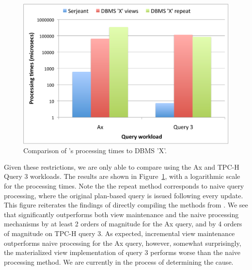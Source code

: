 \begin{figure}[htbp]
\includegraphics[scale=0.35]{figures/dbcomp}
\caption{Comparison of \compiler's processing times to DBMS 'X'.}
\label{fig:dbcomp}
\end{figure}

Given these restrictions, we are only able to compare using the Ax and TPC-H
Query 3 workloads. The results are shown in Figure~\ref{fig:dbcomp}, with a
logarithmic scale for the processing times. Note the the repeat method
corresponds to naive query processing, where the original plan-based query is
issued following every update. This figure reiterates the findings of directly
compiling the methods from \compiler. We see that \compiler significantly
outperforms both view maintenance and the naive processing mechanisms by at
least 2 orders of magnitude for the Ax query, and by 4 orders of magnitude on
TPC-H query 3. As expected, incremental view maintenance outperforms naive
processing for the Ax query, however, somewhat surprisingly, the materialized
view implementation of query 3 performs worse than the naive processing
method. We are currently in the process of determining the cause.




